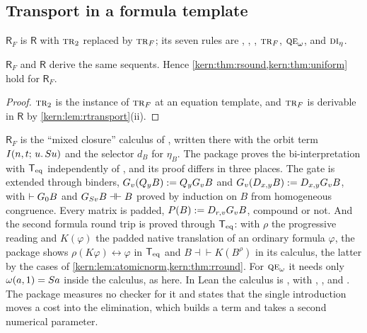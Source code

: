 \subsection{Transport in a formula template}
\label{kern:sec:mixed}

\begin{definition}
\label{kern:def:RF}
$\mathsf{R}_{F}$ is $\mathsf{R}$ with $\rulename{Tr}_{2}$ replaced by
$\rulename{Tr}_{F}$; its seven rules are , ,
, $\rulename{Tr}_{F}$, $\rulename{QE}_{\omega}$, 
and $\rulename{DI}_{\eta}$.
\end{definition}

\begin{proposition}
\label{kern:prop:mixed}
$\mathsf{R}_{F}$ and $\mathsf{R}$ derive the same sequents.  Hence
\cref{kern:thm:rsound,kern:thm:uniform} hold for $\mathsf{R}_{F}$.
\end{proposition}

\begin{proof}
$\rulename{Tr}_{2}$ is the instance of $\rulename{Tr}_{F}$ at an equation
template, and $\rulename{Tr}_{F}$ is derivable in $\mathsf{R}$ by
\cref{kern:lem:rtransport}(ii).
\end{proof}

\begin{remark}
\label{kern:rem:mixed-sources}
$\mathsf{R}_{F}$ is the ``mixed closure'' calculus of
, written there with the orbit term
$I(n,t;\,u.\,S u)$ and the selector $d_B$ for $\eta_B$.  The package
proves the bi-interpretation with $\mathsf{T}_{\mathrm{eq}}$ independently of
, and its proof differs in three places.  The gate is
extended through binders, $G_v(Q_{y}B)\mathrel{:=}Q_{y}G_vB$ and
$G_v(D_{x,y}B)\mathrel{:=}D_{x,y}G_vB$, with $\vdash G_0B$ and
$G_{S v}B\dashv\vdash B$ proved by induction on $B$ from homogeneous
congruence.  Every matrix is padded, $P(B)\mathrel{:=}D_{r,v}G_vB$, compound or
not.  And the second formula round trip is proved through $\mathsf{T}_{\mathrm{eq}}$: with
$\rho$ the progressive reading and $K(\varphi)$ the padded native
translation of an ordinary formula $\varphi$, the package shows
$\rho(K\varphi)\leftrightarrow\varphi$ in $\mathsf{T}_{\mathrm{eq}}$ and
$B\dashv\vdash K(B^{\rho})$ in its calculus, the latter by the cases of
\cref{kern:lem:atomicnorm,kern:thm:rround}.  For $\rulename{QE}_{\omega}$
it needs only $\omega(a,1)=S a$ inside the calculus, as here.  In Lean
the calculus is , with ,
,  and
.  The package measures no checker for it and
states that the single introduction moves a cost into the elimination, which
builds a term and takes a second numerical parameter.
\end{remark}


